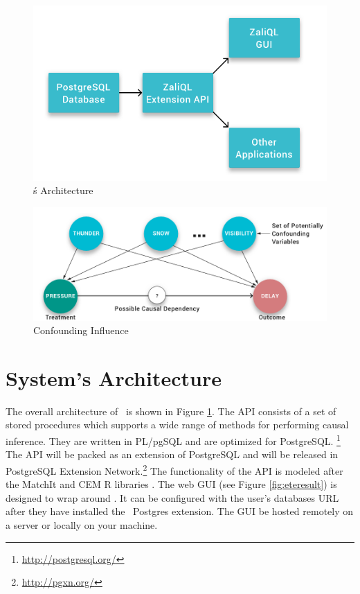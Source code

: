 
\begin{figure}
 \includegraphics[scale=0.25]{Figures/System-Overview.png}
 \caption{\GSQLB\'s Architecture}
  \label{fig:arch}
  \vspace{-3mm}
\end{figure}

\begin{figure}
\hspace*{.3cm}\includegraphics[scale=0.2]{figures/Scenario-Graph.png}
\caption{Confounding Influence }

\label{fig:cv}
\vspace{-0.3cm}
\end{figure}

\section{System's Architecture}

The overall architecture of \GSQL\ is shown in Figure \ref{fig:arch}.
The API consists of a set of stored procedures which supports a wide range of methods for performing causal inference.  They are written in PL/pgSQL and are optimized for PostgreSQL. \footnote{\url{http://postgresql.org/}}
The API will be packed  as an extension of  PostgreSQL and will be released in 
PostgreSQL Extension Network.\footnote{\url{http://pgxn.org/}}
The functionality of the API is modeled after the MatchIt and CEM R libraries \cite{ho2005,iacus2009cem}. The web GUI (see Figure \ref{fig:eteresult}) is designed to wrap around \GSQL. It can be configured with the user's databases URL after they have installed the \GSQL\ Postgres extension. The  GUI be hosted remotely on a server or locally on your machine. 

